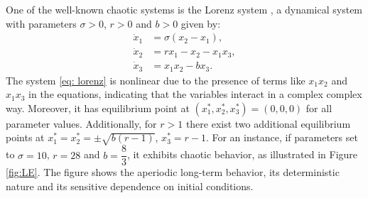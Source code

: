 \documentclass[11pt]{article}
\theoremstyle{definition}
\begin{document}
One of the well-known chaotic systems is the Lorenz system \cite{Lorenz}, a dynamical system with parameters $\sigma > 0$, $r > 0$ and $b > 0$ given by:
\begin{equation} \label{eq: lorenz}  
\begin{aligned}
\dot{x}_1 &= \sigma(x_2 - x_1), \\
\dot{x}_2 &= rx_1 - x_2 - x_1x_3, \\
\dot{x}_3 &= x_1x_2 - bx_3.
\end{aligned}
\end{equation}
The system \eqref{eq: lorenz} is nonlinear due to the presence of terms like $x_1x_2$ and $x_1x_3$ in the equations, indicating that the variables interact in a complex complex way. Moreover, it has equilibrium point at $(x^*_1, x^*_2, x^*_3) = (0, 0, 0)$ for all parameter values. Additionally, for $r > 1$ there exist two additional equilibrium points at $x^*_1 = x^*_2 = \pm \sqrt{b(r - 1)}$, $x^*_3 = r-1$. 
For an instance, if parameters set to $\sigma = 10$, $r = 28$ and $b = \dfrac{8}{3}$, it exhibits chaotic behavior, as illustrated in Figure \ref{fig:LE}. The figure shows the aperiodic long-term behavior, its deterministic nature and its sensitive dependence on initial conditions.
\end{document}
